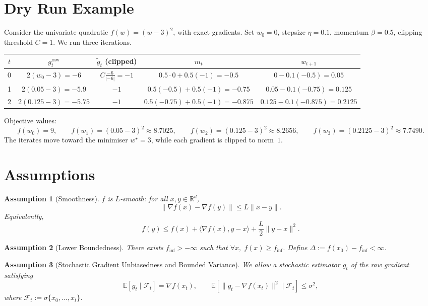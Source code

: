 \documentclass{article}
\newtheorem{assumption}{Assumption}
\begin{document}
\section*{Dry Run Example}
Consider the univariate quadratic $f(w)=(w-3)^2$, with exact gradients.
Set $w_0=0$, stepsize $\eta=0.1$, momentum $\beta=0.5$, clipping threshold $C=1$.
We run three iterations.

\begin{center}
\begin{tabular}{c|c|c|c|c}
$t$ & $g_t^{\text{raw}}$ & $\tilde g_t$ (clipped) & $m_t$ & $w_{t+1}$ \\
\hline
0 & $2(w_0-3) = -6$ & $C\frac{-6}{|{-6}|}=-1$ & $0.5\cdot0+0.5(-1)=-0.5$ & $0-0.1(-0.5)=0.05$ \\
1 & $2(0.05-3)=-5.9$ & $-1$ & $0.5(-0.5)+0.5(-1)=-0.75$ & $0.05-0.1(-0.75)=0.125$ \\
2 & $2(0.125-3)=-5.75$ & $-1$ & $0.5(-0.75)+0.5(-1)=-0.875$ & $0.125-0.1(-0.875)=0.2125$
\end{tabular}
\end{center}

Objective values:
\[
f(w_0)=9,\qquad f(w_1)= (0.05-3)^2\approx 8.7025,\qquad
f(w_2)= (0.125-3)^2\approx 8.2656,\qquad
f(w_3)= (0.2125-3)^2\approx 7.7490.
\]
The iterates move toward the minimiser $w^\star=3$, while each gradient is clipped to norm~$1$.

\newpage
\section*{Assumptions}
\begin{assumption}[Smoothness]\label{as:smooth}
$f$ is $L$‑smooth: for all $x,y\in\mathbb{R}^d$,
\[
\|\nabla f(x)-\nabla f(y)\|\le L\|x-y\|.
\tag{A1}
\]
Equivalently,
\[
f(y)\le f(x)+\langle\nabla f(x),y-x\rangle+\frac{L}{2}\|y-x\|^2 .
\tag{A1'}
\]
\end{assumption}

\begin{assumption}[Lower Boundedness]\label{as:lb}
There exists $f_{\inf}>-\infty$ such that $\forall x,\;f(x)\ge f_{\inf}$. Define $\Delta:=f(x_0)-f_{\inf}<\infty$.
\end{assumption}

\begin{assumption}[Stochastic Gradient Unbiasedness and Bounded Variance]\label{as:stoch}
We allow a stochastic estimator $g_t$ of the raw gradient satisfying
\[
\mathbb{E}[g_t \mid \mathcal{F}_t]=\nabla f(x_t),\qquad
\mathbb{E}[\|g_t-\nabla f(x_t)\|^2\mid \mathcal{F}_t]\le\sigma^2,
\tag{A3}
\]
where $\mathcal{F}_t:=\sigma\{x_0,\dots,x_t\}$.
\end{assumption}
\end{document}
